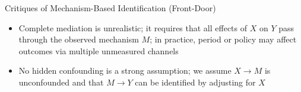 \documentclass[aspectratio=1610,12pt,xcolor=dvipsnames]{beamer}
\begin{document}
\begin{frame}{Critiques of Mechanism-Based Identification (Front-Door)}

\begin{itemize}
    \item Complete mediation is unrealistic; it
    requires that all effects of $X$ on $Y$ pass through the observed mechanism $M$; in practice, period or policy may affect outcomes via multiple unmeasured channels
    \item No hidden confounding is a strong assumption; we assume $X \to M$ is unconfounded and that $M \to Y$ can be identified by adjusting for $X$
\end{itemize}

\end{frame}
\end{document}
